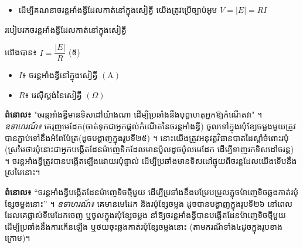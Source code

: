 \vspace{0.7em}
\noindent
\begin{itemize}[itemsep=2pt, topsep=4pt, parsep=0pt, leftmargin=1.6em]
	\item[$\succ$] ដើម្បីគណនាចរន្តអាំងឌ្វីដែលកាត់នៅក្នុងសៀគ្វី យើងត្រូវប្រើច្បាប់អូម $V = |E| = RI$
\end{itemize}

\vspace{0.5em}
\noindent
\begin{formulabox}[breakable=false]{
	របៀបរកចរន្តអាំងឌ្វីដែលកាត់នៅក្នុងសៀគ្វី }
\begin{center}
		យើងបាន៖ \quad $\boxed{I = \dfrac{|E|}{R}}$ \quad (៥)
	\end{center}

	\begin{center}
	\begin{minipage}{0.70\linewidth}
		\centering
	\begin{itemize}[itemsep=2pt, topsep=2pt, parsep=0pt, leftmargin=1.5em]
		\item $I$៖ ចរន្តអាំងឌ្វីនៅក្នុងសៀគ្វី $(\mathrm{A})$
		\item $R$៖ រេស៊ីស្តង់នៃសៀគ្វី $(\Omega)$
	\end{itemize}
	\end{minipage}
	\end{center}
\end{formulabox}

\textbf{\textcolor{brownheader}{ពំនោល៖}} "ចរន្តអាំងឌ្វីមានទិសដៅយ៉ាងណា ដើម្បីប្រឆាំងនឹងបុព្វហេតុអ្នកឱ្យកំណើតវា" ។
\textit{ឧទាហរណ៍៖} គេរុញមេដែក(ចាត់ទុកជាអ្នកផ្តល់កំណើតនៃចរន្តអាំងឌ្វី) ចូលទៅក្នុងរបុំខ្សែចម្លងមួយត្រូវបានភ្ជាប់ទៅនឹងអំពែម៉ែត្រ(ដូចបង្ហាញក្នុងរូបទី២៥) ។ នោះយើងត្រូវអនុវត្តវិធានបាតដៃស្តាំចំពោះរបុំ (ស្រមៃថារបុំនោះជាអ្នកបង្កើតដែនម៉ាញេទិកដែលមានប៉ូលដូចប៉ូលមេដែក ដើម្បីទាញរកទិសដៅចរន្ត) ។ ចរន្តអាំងឌ្វីត្រូវបានបង្កើតឡើងដោយរបុំផ្ទាល់ ដើម្បីប្រឆាំងមានទិសដៅផ្ទុយពីចរន្តដែលយើងទើបនឹងស្រមៃនោះ។

\vspace{0.5em}
\begin{center}
\end{center}

\textbf{\textcolor{brownheader}{ពំនោល៖}} “ចរន្តអាំងឌ្វីបង្កើតដែនម៉ាញេទិចថ្មីមួយ ដើម្បីប្រឆាំងនឹងបម្រែបម្រួលភ្លុចម៉ាញេទិចឆ្លងកាត់របុំខ្សែចម្លងនោះ” ។
\textit{ឧទាហរណ៍៖} គេមានមេដែក និងរបុំខ្សែចម្លង ដូចបានបង្ហាញក្នុងរូបទី២៦ នៅពេលដែលគេផ្លាស់ទីមេដែកចេញ ឬចូលក្នុងរបុំខ្សែចម្លង នាំឱ្យចរន្តអាំងឌ្វីបានបង្កើតដែនម៉ាញេទិចថ្មីមួយ ដើម្បីប្រឆាំងនឹងការកើនឡើង ឬថយចុះឆ្លងកាត់របុំខ្សែចម្លងនោះ (តាមករណីទាំង៤ដូចក្នុងរូបខាងក្រោម)។

